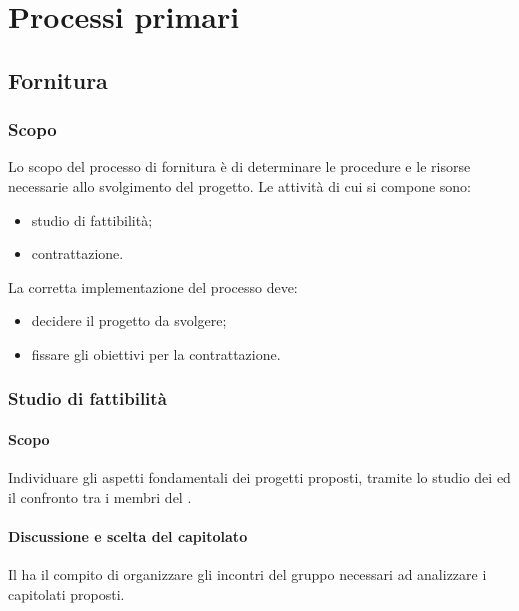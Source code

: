 \section{Processi primari}
    \subsection{Fornitura}
        \subsubsection{Scopo}
        Lo scopo del processo di fornitura è di determinare le procedure e le risorse necessarie allo svolgimento del progetto. Le attività di cui si compone sono:
        \begin{itemize}
            \item studio di fattibilità;
            \item contrattazione.
        \end{itemize}
        La corretta implementazione del processo deve:
        \begin{itemize}
            \item decidere il progetto da svolgere;
            \item fissare gli obiettivi per la contrattazione.
        \end{itemize}
        \subsubsection{Studio di fattibilità}
            \paragraph{Scopo}
            Individuare gli aspetti fondamentali dei progetti proposti, tramite lo studio dei  ed il confronto tra i membri del .
            \paragraph{Discussione e scelta del capitolato}
            Il \responsabilediprogetto{} ha il compito di organizzare gli incontri del gruppo necessari ad analizzare i capitolati proposti.
